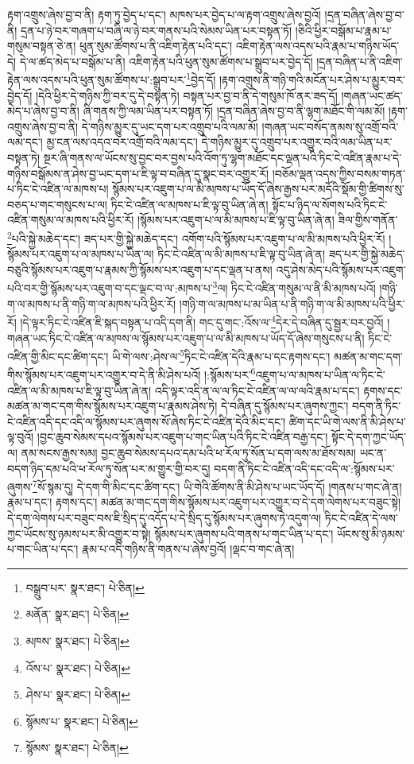 རྟག་འགྲུས་ཞེས་བྱ་བ་ནི། རྟག་ཏུ་བྱེད་པ་དང་། མཁས་པར་བྱེད་པ་ལ་རྟག་འགྲུས་ཞེས་བྱའོ། །དྲན་བཞིན་ཞེས་བྱ་བ་ནི། དྲན་པ་ཉེ་བར་གཞག་པ་བཞི་ལ་ཉེ་བར་གནས་པའི་སེམས་ཡིན་པར་བསྟན་ཏོ། །ཅིའི་ཕྱིར་བསྒོམ་པ་རྣམ་པ་གསུམ་བསྟན་ཅེ་ན། ཕུན་སུམ་ཚོགས་པ་ནི་འཇིག་རྟེན་པའི་དང་། འཇིག་རྟེན་ལས་འདས་པའི་རྣམ་པ་གཉིས་ཡོད་དེ། དེ་ལ་ཚད་མེད་པ་བསྒོམ་པ་ནི། འཇིག་རྟེན་པའི་ཕུན་སུམ་ཚོགས་པ་སྒྲུབ་པར་བྱེད་དོ། །དྲན་བཞིན་པ་ནི་འཇིག་རྟེན་ལས་འདས་པའི་ཕུན་སུམ་ཚོགས་པ་:སྒྲུབ་པར་\footnote{བསྒྲུབ་པར་  སྣར་ཐང་།  པེ་ཅིན། }བྱེད་དོ། །རྟག་འགྲུས་ནི་གཉི་གའི་མངོན་པར་ཤེས་པ་མྱུར་བར་བྱེད་དོ། །དེའི་ཕྱིར་དེ་གཉིས་ཀྱི་བར་དུ་དེ་བསྟན་ཏེ། བསྟན་པར་བྱ་བ་ནི་དེ་གསུམ་ཁོ་ནར་ཟད་དོ། །གཞན་ཡང་ཚད་མེད་པ་ཞེས་བྱ་བ་ནི། ཞི་གནས་ཀྱི་ལམ་ཡིན་པར་བསྟན་ཏོ། །དྲན་བཞིན་ཞེས་བྱ་བ་ནི་ལྷག་མཐོང་གི་ལམ་མོ། །རྟག་འགྲུས་ཞེས་བྱ་བ་ནི། དེ་གཉིས་མྱུར་དུ་ཡང་དག་པར་འགྲུབ་པའི་ལམ་མོ། །གཞན་ཡང་བསོད་ནམས་སུ་འགྲོ་བའི་ལམ་དང་། མྱ་ངན་ལས་འདའ་བར་འགྲོ་བའི་ལམ་དང་། དེ་གཉིས་མྱུར་དུ་འགྲུབ་པར་འགྱུར་བའི་ལམ་ཡིན་པར་བསྟན་ཏེ། སྔར་ཞི་གནས་ལ་ཡོངས་སུ་བྱང་བར་བྱས་པའི་འོག་ཏུ་ལྷག་མཐོང་དང་ལྡན་པའི་ཏིང་ངེ་འཛིན་རྣམ་པ་དེ་གཉིས་བསྒོམས་ན་ཤེས་བྱ་ཡང་དག་པ་ཇི་ལྟ་བ་བཞིན་དུ་སྣང་བར་འགྱུར་རོ། །བཅོམ་ལྡན་འདས་ཀྱིས་བསམ་གཏན་པ་ཏིང་ངེ་འཛིན་ལ་མཁས་པ། སྙོམས་པར་འཇུག་པ་ལ་མི་མཁས་པ་ཡོད་དོ་ཞེས་རྒྱས་པར་མདོའི་སྡོམ་གྱི་ཚིགས་སུ་བཅད་པ་གང་གསུངས་པ་ལ། ཏིང་ངེ་འཛིན་ལ་མཁས་པ་ཇི་ལྟ་བུ་ཡིན་ཞེ་ན། སྟོང་པ་ཉིད་ལ་སོགས་པའི་ཏིང་ངེ་འཛིན་གསུམ་ལ་མཁས་པའི་ཕྱིར་རོ། །སྙོམས་པར་འཇུག་པ་ལ་མི་མཁས་པ་ཇི་ལྟ་བུ་ཡིན་ཞེ་ན། ཟིལ་གྱིས་གནོན་\footnote{མནོན་  སྣར་ཐང་།  པེ་ཅིན། }པའི་སྐྱེ་མཆེད་དང་། ཟད་པར་གྱི་སྐྱེ་མཆེད་དང་། འགོག་པའི་སྙོམས་པར་འཇུག་པ་ལ་མི་མཁས་པའི་ཕྱིར་རོ། །སྙོམས་པར་འཇུག་པ་ལ་མཁས་པ་ཡིན་ལ། ཏིང་ངེ་འཛིན་ལ་མི་མཁས་པ་ཇི་ལྟ་བུ་ཡིན་ཞེ་ན། ཟད་པར་གྱི་སྐྱེ་མཆེད་བཅུའི་སྙོམས་པར་འཇུག་པ་རྣམས་ཀྱི་སྙོམས་པར་འཇུག་པ་དང་ལྡན་པ་ནས། འདུ་ཤེས་མེད་པའི་སྙོམས་པར་འཇུག་པའི་བར་གྱི་སྙོམས་པར་འཇུག་བ་དང་ལྡང་བ་ལ་:མཁས་པ་\footnote{མཁས་  སྣར་ཐང་།  པེ་ཅིན། }ལ། ཏིང་ངེ་འཛིན་གསུམ་ལ་ནི་མི་མཁས་པའོ། །གཉི་ག་ལ་མཁས་པ་ནི་གཉི་ག་ལ་མཁས་པའི་ཕྱིར་རོ། །གཉི་ག་ལ་མཁས་པ་མ་ཡིན་པ་ནི་གཉི་ག་ལ་མི་མཁས་པའི་ཕྱིར་རོ། །དེ་ལྟར་ཏིང་ངེ་འཛིན་ཇི་སྐད་བསྟན་པ་འདི་དག་ནི། གང་དུ་གང་:འོས་ལ་\footnote{འོས་པ་  སྣར་ཐང་།  པེ་ཅིན། }དེར་དེ་བཞིན་དུ་སྦྱར་བར་བྱའོ། །གཞན་ཡང་ཏིང་ངེ་འཛིན་ལ་མཁས་ལ་སྙོམས་པར་འཇུག་པ་ལ་མི་མཁས་པ་ཡོད་དོ་ཞེས་གསུངས་པ་ནི། ཏིང་ངེ་འཛིན་གྱི་མིང་དང་ཚིག་དང་། ཡི་གེ་ལས་:ཤེས་ལ་\footnote{ཤེས་པ་  སྣར་ཐང་།  པེ་ཅིན། }ཏིང་ངེ་འཛིན་དེའི་རྣམ་པ་དང་རྟགས་དང་། མཚན་མ་གང་དག་གིས་སྙོམས་པར་འཇུག་པར་འགྱུར་བ་དེ་ནི་མི་ཤེས་པའོ། །:སྙོམས་པར་\footnote{སྙོམས་པ་  སྣར་ཐང་།  པེ་ཅིན། }འཇུག་པ་ལ་མཁས་པ་ཡིན་ལ་ཏིང་ངེ་འཛིན་ལ་མི་མཁས་པ་ཇི་ལྟ་བུ་ཡིན་ཞེ་ན། འདི་ལྟར་འདི་ན་ལ་ལ་ཏིང་ངེ་འཛིན་ལ་ལ་ལའི་རྣམ་པ་དང་། རྟགས་དང་མཚན་མ་གང་དག་གིས་སྙོམས་པར་འཇུག་པ་རྣམས་ཤེས་ཏེ། དེ་བཞིན་དུ་སྙོམས་པར་ཞུགས་ཀྱང་། བདག་ནི་ཏིང་ངེ་འཛིན་འདི་དང་འདི་ལ་སྙོམས་པར་ཞུགས་སོ་ཞེས་ཏིང་ངེ་འཛིན་དེའི་མིང་དང་། ཚིག་དང་ཡི་གེ་ལས་ནི་མི་ཤེས་པ་ལྟ་བུའོ། །བྱང་ཆུབ་སེམས་དཔའ་སྙོམས་པར་འཇུག་པ་གང་ཡིན་པའི་ཏིང་ངེ་འཛིན་བརྒྱ་དང་། སྟོང་དེ་དག་ཀྱང་ཡོད་ལ། ནམ་སངས་རྒྱས་སམ། བྱང་ཆུབ་སེམས་དཔའ་དམ་པའི་ཕ་རོལ་ཏུ་སོན་པ་དག་ལས་མ་ཐོས་སམ། ཡང་ན་བདག་ཉིད་དམ་པའི་ཕ་རོལ་ཏུ་སོན་པར་མ་གྱུར་གྱི་བར་དུ། བདག་ནི་ཏིང་ངེ་འཛིན་འདི་དང་འདི་ལ་:སྙོམས་པར་ཞུགས་\footnote{སྙོམས་  སྣར་ཐང་།  པེ་ཅིན། }སོ་སྙམ་དུ། དེ་དག་གི་མིང་དང་ཚིག་དང་། ཡི་གེའི་ཚོགས་ནི་མི་ཤེས་པ་ཡང་ཡོད་དོ། །གནས་པ་གང་ཞེ་ན། རྣམ་པ་དང་། རྟགས་དང་། མཚན་མ་གང་དག་གིས་སྙོམས་པར་འཇུག་པར་འགྱུར་བ་དེ་དག་ལེགས་པར་བཟུང་སྟེ། དེ་དག་ལེགས་པར་བཟུང་བས་ཇི་སྲིད་དུ་འདོད་པ་དེ་སྲིད་དུ་སྙོམས་པར་ཞུགས་ཏེ་འདུག་ལ། ཏིང་ངེ་འཛིན་དེ་ལས་ཀྱང་ཡོངས་སུ་ཉམས་པར་མི་འགྱུར་བ་སྟེ། སྙོམས་པར་ཞུགས་པའི་གནས་པ་གང་ཡིན་པ་དང་། ཡོངས་སུ་མི་ཉམས་པ་གང་ཡིན་པ་དང་། རྣམ་པ་འདི་གཉིས་ནི་གནས་པ་ཞེས་བྱའོ། །ལྡང་བ་གང་ཞེ་ན། 